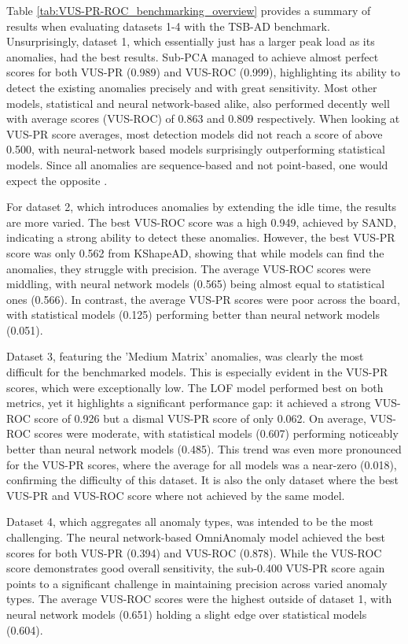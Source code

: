 \documentclass[12pt,oneside]{article}
\begin{document}
Table \ref{tab:VUS-PR-ROC_benchmarking_overview} provides a summary of results when evaluating datasets 1-4 with the TSB-AD benchmark.
Unsurprisingly, dataset 1, which essentially just has a larger peak load as its anomalies, had the best results. Sub-PCA managed to achieve almost perfect scores for both VUS-PR (0.989) and VUS-ROC (0.999), highlighting its ability to detect the existing anomalies precisely and with great sensitivity. Most other models, statistical and neural network-based alike, also performed decently well with average scores (VUS-ROC) of 0.863 and 0.809 respectively.
When looking at VUS-PR score averages, most detection models did not reach a score of above 0.500, with neural-network based models surprisingly outperforming statistical models. Since all anomalies are sequence-based and not point-based, one would expect the opposite \parencites[p.~10]{liu2024elephant}[p.~1706]{paparrizos2022tsb}.\par
For dataset 2, which introduces anomalies by extending the idle time, the results are more varied. The best VUS-ROC score was a high 0.949, achieved by SAND, indicating a strong ability to detect these anomalies. However, the best VUS-PR score was only 0.562 from KShapeAD, showing that while models can find the anomalies, they struggle with precision. The average VUS-ROC scores were middling, with neural network models (0.565) being almost equal to statistical ones (0.566). In contrast, the average VUS-PR scores were poor across the board, with statistical models (0.125) performing better than neural network models (0.051). \par
Dataset 3, featuring the 'Medium Matrix' anomalies, was clearly the most difficult for the benchmarked models. This is especially evident in the VUS-PR scores, which were exceptionally low. The LOF model performed best on both metrics, yet it highlights a significant performance gap: it achieved a strong VUS-ROC score of 0.926 but a dismal VUS-PR score of only 0.062. On average, VUS-ROC scores were moderate, with statistical models (0.607) performing noticeably better than neural network models (0.485). This trend was even more pronounced for the VUS-PR scores, where the average for all models was a near-zero (0.018), confirming the difficulty of this dataset. It is also the only dataset where the best VUS-PR and VUS-ROC score where not achieved by the same model. \par
Dataset 4, which aggregates all anomaly types, was intended to be the most challenging. The neural network-based OmniAnomaly model achieved the best scores for both VUS-PR (0.394) and VUS-ROC (0.878). While the VUS-ROC score demonstrates good overall sensitivity, the sub-0.400 VUS-PR score again points to a significant challenge in maintaining precision across varied anomaly types. The average VUS-ROC scores were the highest outside of dataset 1, with neural network models (0.651) holding a slight edge over statistical models (0.604).
\end{document}

